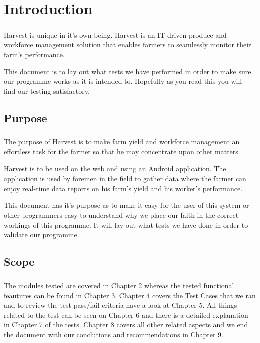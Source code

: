 \documentclass[11pt,fleqn]{book} %
\begin{document}

\chapter{Introduction}
	\paragraph{}
		Harvest is unique in it's own being. Harvest is an IT driven produce and workforce management solution that enables farmers to seamlessly monitor their farm’s performance.
		
		This document is to lay out what tests we have performed in order to make sure our programme works as it is intended to. Hopefully as you read this you will find our testing satisfactory.
	\section{Purpose}
		\paragraph{}
			The purpose of Harvest is to make farm yield and workforce management an effortless task for the farmer so that he may concentrate upon other matters.
			
			Harvest is to be used on the web and using an Android application. The application is used by foremen in the field to gather data where the farmer can enjoy real-time data reports on his farm's yield and his worker's performance.
			
			This document has it's purpose as to make it easy for the user of this system or other programmers easy to understand why we place our faith in the correct workings of this programme. It will lay out what tests we have done in order to validate our programme.
	\section{Scope}
		\paragraph{}
			The modules tested are covered in Chapter 2 whereas the tested functional feautures can be found in Chapter 3. Chapter 4 covers the Test Cases that we ran and to review the test pass/fail criteria have a look at Chapter 5. All things related to the test can be seen on Chapter 6 and there is a detailed explanation in Chapter 7 of the tests. Chapter 8 covers all other related aspects and we end the document with our conclutions and recommendations in Chapter 9.
\end{document}
